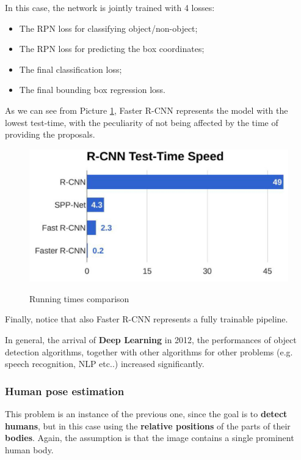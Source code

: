 In this case, the network is jointly trained with 4 losses:

\begin{itemize}
    \item The RPN loss for classifying object/non-object;
    \item The RPN loss for predicting the box coordinates;
    \item The final classification loss;
    \item The final bounding box regression loss.
\end{itemize}

As we can see from Picture \ref{faster r-cnn2}, Faster R-CNN represents the model with the lowest test-time, with the peculiarity of not being affected by the time of providing the proposals.

\begin{figure}[h!]
		\centering
        \includegraphics[scale = 0.40]{img/faster r-cnn2.jpg}
		\label{faster r-cnn2}
        \caption{Running times comparison}
\end{figure}

Finally, notice that also Faster R-CNN represents a fully trainable pipeline.

In general, the arrival of \textbf{Deep Learning} in 2012, the performances of object detection algorithms, together with other algorithms for other problems (e.g. speech recognition, NLP etc..) increased significantly.

\subsubsection{Human pose estimation}
This problem is an instance of the previous one, since the goal is to \textbf{detect humans}, but in this case using the \textbf{relative positions} of the parts of their \textbf{bodies}. Again, the assumption is that the image contains a single prominent human body.

